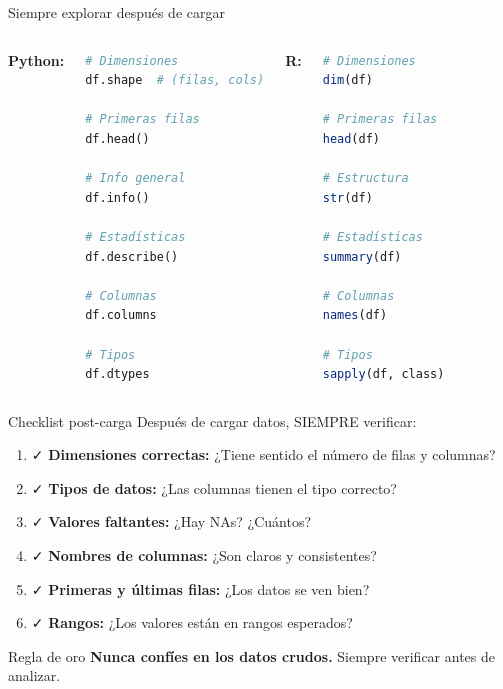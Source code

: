 \documentclass[aspectratio=169]{beamer}
\begin{document}
\begin{frame}[fragile]{Siempre explorar después de cargar}
\begin{columns}[t]
\textbf{Python:}
\begin{lstlisting}[language=Python]
# Dimensiones
df.shape  # (filas, cols)

# Primeras filas
df.head()

# Info general
df.info()

# Estadísticas
df.describe()

# Columnas
df.columns

# Tipos
df.dtypes
\end{lstlisting}

\textbf{R:}
\begin{lstlisting}[language=R]
# Dimensiones
dim(df)

# Primeras filas
head(df)

# Estructura
str(df)

# Estadísticas
summary(df)

# Columnas
names(df)

# Tipos
sapply(df, class)
\end{lstlisting}
\end{columns}
\end{frame}

\begin{frame}{Checklist post-carga}
Después de cargar datos, SIEMPRE verificar:

\begin{enumerate}
    \item ✓ \textbf{Dimensiones correctas:} ¿Tiene sentido el número de filas y columnas?
    \item ✓ \textbf{Tipos de datos:} ¿Las columnas tienen el tipo correcto?
    \item ✓ \textbf{Valores faltantes:} ¿Hay NAs? ¿Cuántos?
    \item ✓ \textbf{Nombres de columnas:} ¿Son claros y consistentes?
    \item ✓ \textbf{Primeras y últimas filas:} ¿Los datos se ven bien?
    \item ✓ \textbf{Rangos:} ¿Los valores están en rangos esperados?
\end{enumerate}

\vspace{1em}
\begin{alertblock}{Regla de oro}
\textbf{Nunca confíes en los datos crudos.} Siempre verificar antes de analizar.
\end{alertblock}
\end{frame}
\end{document}
